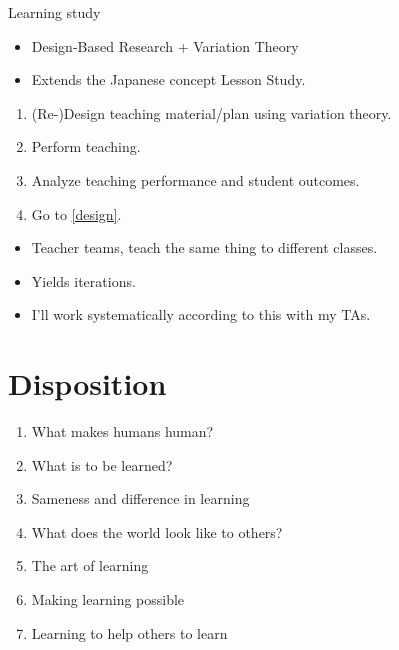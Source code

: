 \begin{frame}
  \begin{block}{Learning study~\cite{LearningStudy}}
    \begin{itemize}
      \item Design-Based Research + Variation Theory
      \item Extends the Japanese concept Lesson Study.
    \end{itemize}
    \pause
    \begin{enumerate}
      \item \label{design} (Re-)Design teaching material/plan using variation 
        theory.
      \item Perform teaching.
      \item Analyze teaching performance and student outcomes.
      \item Go to \ref{design}.
    \end{enumerate}
  \end{block}

  \pause

  \begin{remark}
    \begin{itemize}
      \item Teacher teams, teach the same thing to different classes.
      \item Yields iterations.
    \end{itemize}
  \end{remark}
\end{frame}

\begin{frame}
  \begin{example}
    \begin{itemize}
      \item I'll work systematically according to this with my TAs.
    \end{itemize}
  \end{example}
\end{frame}

\section{Disposition}

\begin{frame}
  \begin{enumerate}
    \item What makes humans human?
    \item What is to be learned?
    \item Sameness and difference in learning
    \item What does the world look like to others?
    \item The art of learning
    \item Making learning possible
    \item Learning to help others to learn
  \end{enumerate}
\end{frame}

